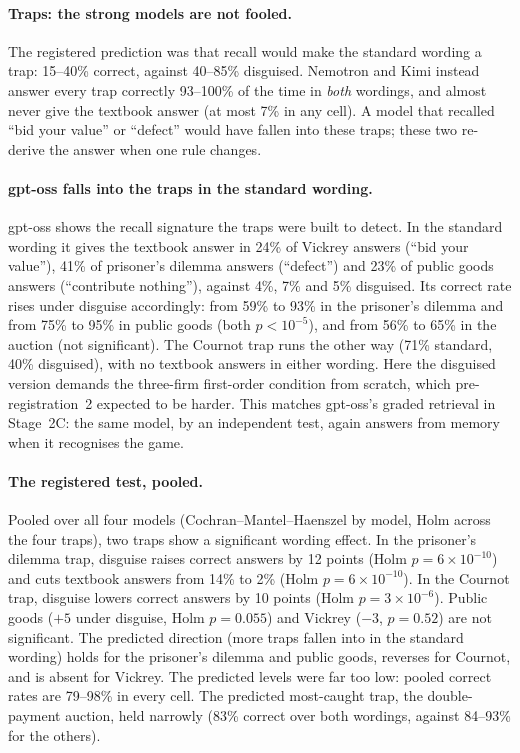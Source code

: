 \documentclass[11pt]{article}
\theoremstyle{definition}
\theoremstyle{remark}
\begin{document}
\paragraph{Traps: the strong models are not fooled.} The registered prediction was that
recall would make the standard wording a trap: 15--40\% correct, against 40--85\% disguised.
Nemotron and Kimi instead answer every trap correctly 93--100\% of the time in \emph{both}
wordings, and almost never give the textbook answer (at most 7\% in any cell). A model that
recalled ``bid your value'' or ``defect'' would have fallen into these traps; these two
re-derive the answer when one rule changes.

\paragraph{gpt-oss falls into the traps in the standard wording.} gpt-oss shows the recall
signature the traps were built to detect. In the standard wording it gives the textbook answer in
24\% of Vickrey answers (``bid your value''), 41\% of prisoner's dilemma answers (``defect'') and
23\% of public goods answers (``contribute nothing''), against 4\%, 7\% and 5\% disguised. Its
correct rate rises under disguise accordingly: from 59\% to 93\% in the prisoner's dilemma and
from 75\% to 95\% in public goods (both $p<10^{-5}$), and from 56\% to 65\% in the auction
(not significant). The Cournot trap runs the other way (71\% standard, 40\% disguised), with no
textbook answers in either wording. Here the disguised version demands the three-firm
first-order condition from scratch, which pre-registration~2 expected to be harder. This
matches gpt-oss's graded retrieval in Stage~2C: the same model, by an independent test, again
answers from memory when it recognises the game.

\paragraph{The registered test, pooled.} Pooled over all four models (Cochran--Mantel--Haenszel
by model, Holm across the four traps), two traps show a significant wording effect. In the
prisoner's dilemma trap, disguise raises correct answers by 12 points (Holm $p=6\times10^{-10}$)
and cuts textbook answers from 14\% to 2\% (Holm $p=6\times10^{-10}$). In the Cournot trap,
disguise lowers correct answers by 10 points (Holm $p=3\times10^{-6}$). Public goods ($+5$ under disguise, Holm
$p=0.055$) and Vickrey ($-3$, $p=0.52$) are not significant. The predicted direction (more
traps fallen into in the standard wording) holds for the prisoner's dilemma and public goods,
reverses for Cournot, and is absent for Vickrey. The predicted levels were far too low: pooled
correct rates are 79--98\% in every cell. The predicted most-caught trap, the double-payment
auction, held narrowly (83\% correct over both wordings, against 84--93\% for the others).
\end{document}
